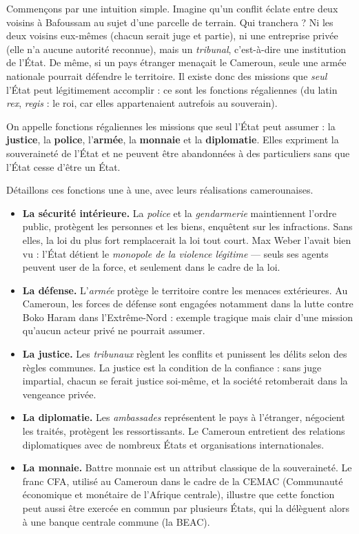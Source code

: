 \documentclass[11pt]{article}
\newcommand{\cle}[1]{{\popxbold\color{popdark}#1}}
\newcounter{popsec}
\newcounter{popsub}
\newcommand{\courssub}[1]{%
  \stepcounter{popsub}%
  \par\vspace{9pt}\noindent{\popxbold\fontsize{11.5}{13}\selectfont\color{popink}{\color{poporange}\thepopsec.\thepopsub}\hspace{6pt}#1}\par\nopagebreak\vspace{4pt}
}
\begin{document}
\courssub{Les fonctions régaliennes : le cœur du métier d'État}

Commençons par une intuition simple. Imagine qu'un conflit éclate entre deux voisins à Bafoussam au sujet d'une parcelle de terrain. Qui tranchera ? Ni les deux voisins eux-mêmes (chacun serait juge et partie), ni une entreprise privée (elle n'a aucune autorité reconnue), mais un \emph{tribunal}, c'est-à-dire une institution de l'État. De même, si un pays étranger menaçait le Cameroun, seule une armée nationale pourrait défendre le territoire. Il existe donc des missions que \emph{seul} l'État peut légitimement accomplir : ce sont les \cle{fonctions régaliennes} (du latin \emph{rex}, \emph{regis} : le roi, car elles appartenaient autrefois au souverain).

\begin{definition}
On appelle \cle{fonctions régaliennes} les missions que seul l'État peut assumer : la \textbf{justice}, la \textbf{police}, l'\textbf{armée}, la \textbf{monnaie} et la \textbf{diplomatie}. Elles expriment la souveraineté de l'État et ne peuvent être abandonnées à des particuliers sans que l'État cesse d'être un État.
\end{definition}

Détaillons ces fonctions une à une, avec leurs réalisations camerounaises.

\begin{itemize}
\item \textbf{La sécurité intérieure.} La \emph{police} et la \emph{gendarmerie} maintiennent l'ordre public, protègent les personnes et les biens, enquêtent sur les infractions. Sans elles, la loi du plus fort remplacerait la loi tout court. Max Weber l'avait bien vu : l'État détient le \emph{monopole de la violence légitime} — seuls ses agents peuvent user de la force, et seulement dans le cadre de la loi.
\item \textbf{La défense.} L'\emph{armée} protège le territoire contre les menaces extérieures. Au Cameroun, les forces de défense sont engagées notamment dans la lutte contre Boko Haram dans l'Extrême-Nord : exemple tragique mais clair d'une mission qu'aucun acteur privé ne pourrait assumer.
\item \textbf{La justice.} Les \emph{tribunaux} règlent les conflits et punissent les délits selon des règles communes. La justice est la condition de la confiance : sans juge impartial, chacun se ferait justice soi-même, et la société retomberait dans la vengeance privée.
\item \textbf{La diplomatie.} Les \emph{ambassades} représentent le pays à l'étranger, négocient les traités, protègent les ressortissants. Le Cameroun entretient des relations diplomatiques avec de nombreux États et organisations internationales.
\item \textbf{La monnaie.} Battre monnaie est un attribut classique de la souveraineté. Le franc CFA, utilisé au Cameroun dans le cadre de la CEMAC (Communauté économique et monétaire de l'Afrique centrale), illustre que cette fonction peut aussi être exercée en commun par plusieurs États, qui la délèguent alors à une banque centrale commune (la BEAC).
\end{itemize}
\end{document}
